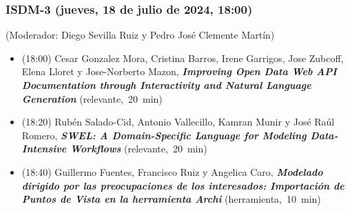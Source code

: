 \begin{frame}
  \frametitle{ISDM-3 (jueves, 18 de julio de 2024, 18:00)}
{\small (Moderador: Diego Sevilla Ruiz y Pedro José Clemente Martín)}
\begin{itemize}


\item {(18:00) Cesar Gonzalez Mora, Cristina Barros, Irene Garrigos, Jose Zubcoff, Elena Lloret y Jose-Norberto Mazon}, %
      {\bfseries\itshape Improving Open Data Web API Documentation through Interactivity and Natural Language Generation} %
      {(relevante,~20~min)}
      

\item {(18:20) Rubén Salado-Cid, Antonio Vallecillo, Kamran Munir y José Raúl Romero}, %
      {\bfseries\itshape SWEL: A Domain-Specific Language for Modeling Data-Intensive Workflows} %
      {(relevante,~20~min)}
      

\item {(18:40) Guillermo Fuentes, Francisco Ruiz y Angelica Caro}, %
      {\bfseries\itshape Modelado dirigido por las preocupaciones de los interesados: Importación de Puntos de Vista en la herramienta Archi} %
      {(herramienta,~10~min)}
      

\end{itemize}
\end{frame}